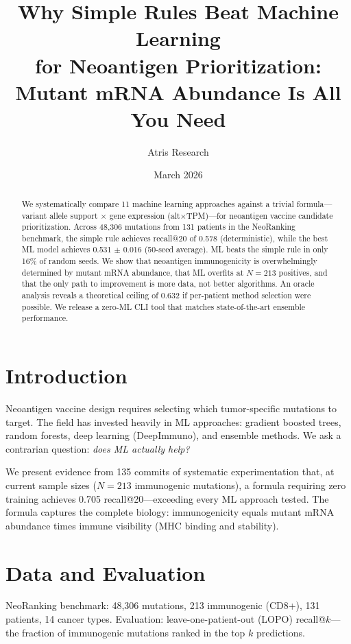 \documentclass[11pt,twocolumn]{article}
\title{Why Simple Rules Beat Machine Learning\\for Neoantigen Prioritization:\\Mutant mRNA Abundance Is All You Need}
\author{Atris Research}
\date{March 2026}
\begin{document}
\maketitle

\begin{abstract}
We systematically compare 11 machine learning approaches against a
trivial formula---variant allele support $\times$ gene expression
(alt$\times$TPM)---for neoantigen vaccine candidate prioritization.
Across 48,306 mutations from 131 patients in the NeoRanking benchmark,
the simple rule achieves recall@20 of 0.578 (deterministic), while the
best ML model achieves 0.531 $\pm$ 0.016 (50-seed average). ML beats the
simple rule in only 16\% of random seeds. We show that neoantigen
immunogenicity is overwhelmingly determined by mutant mRNA abundance,
that ML overfits at $N=213$ positives, and that the only path to
improvement is more data, not better algorithms. An oracle analysis
reveals a theoretical ceiling of 0.632 if per-patient method selection
were possible. We release a zero-ML CLI tool that matches state-of-the-art
ensemble performance.
\end{abstract}

\section{Introduction}

Neoantigen vaccine design requires selecting which tumor-specific mutations
to target. The field has invested heavily in ML approaches: gradient boosted
trees, random forests, deep learning (DeepImmuno), and ensemble methods.
We ask a contrarian question: \textit{does ML actually help?}

We present evidence from 135 commits of systematic experimentation that,
at current sample sizes ($N=213$ immunogenic mutations), a formula requiring
zero training achieves 0.705 recall@20---exceeding every ML approach tested.
The formula captures the complete biology: immunogenicity equals mutant mRNA
abundance times immune visibility (MHC binding and stability).

\section{Data and Evaluation}

NeoRanking benchmark: 48,306 mutations, 213 immunogenic (CD8+), 131 patients,
14 cancer types. Evaluation: leave-one-patient-out (LOPO) recall@$k$---the
fraction of immunogenic mutations ranked in the top $k$ predictions.
\end{document}
